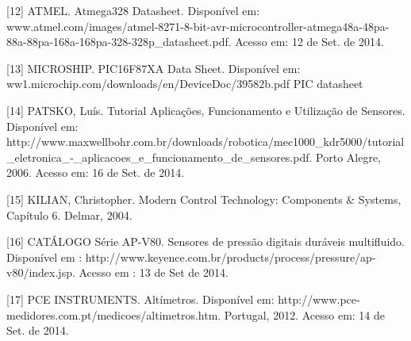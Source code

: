 [12] ATMEL. Atmega328 Datasheet.  Disponível em: www.atmel.com/images/atmel-8271-8-bit-avr-microcontroller-atmega48a-48pa-88a-88pa-168a-168pa-328-328p_datasheet.pdf. Acesso em: 12 de Set. de 2014.

[13] MICROSHIP. PIC16F87XA Data Sheet. Disponível em: ww1.microchip.com/downloads/en/DeviceDoc/39582b.pdf PIC datasheet

[14] PATSKO, Luís. Tutorial Aplicações, Funcionamento e Utilização de Sensores. Disponível em: http://www.maxwellbohr.com.br/downloads/robotica/mec1000_kdr5000/tutorial_eletronica_-_aplicacoes_e_funcionamento_de_sensores.pdf. Porto Alegre, 2006. Acesso em: 16 de Set. de 2014.

[15] KILIAN, Christopher. Modern Control Technology: Components & Systems, Capítulo 6. Delmar, 2004.

[16] CATÁLOGO Série AP-V80. Sensores de pressão digitais duráveis multifluido. Disponível em : http://www.keyence.com.br/products/process/pressure/ap-v80/index.jsp. Acesso em : 13 de Set de 2014.


[17]  PCE INSTRUMENTS. Altímetros. Disponível em: http://www.pce-medidores.com.pt/medicoes/altimetros.htm. Portugal, 2012. Acesso em: 14 de Set. de 2014. 

